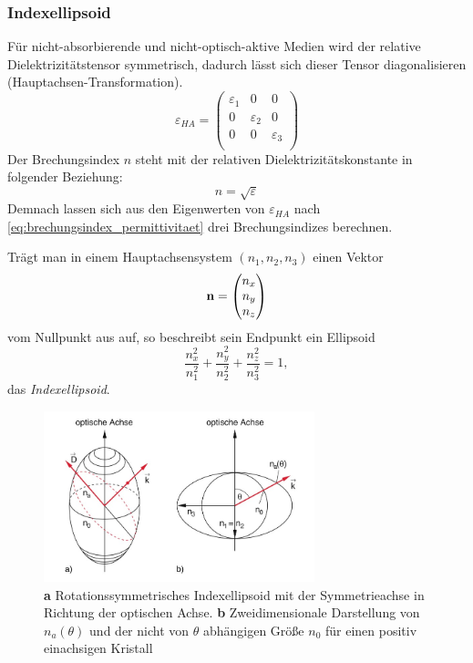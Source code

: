\documentclass[a4paper, 11pt, ngerman, parskip=half-]{scrartcl}
\begin{document}
\subsubsection*{Indexellipsoid}
Für nicht-absorbierende und nicht-optisch-aktive Medien wird der relative Dielektrizitätstensor symmetrisch, dadurch lässt sich dieser
Tensor diagonalisieren (Hauptachsen-Transformation).
%
\[\varepsilon_{HA} = \begin{pmatrix}
        \varepsilon_1 & 0             & 0             \\
        0             & \varepsilon_2 & 0             \\
        0             & 0             & \varepsilon_3 \\
    \end{pmatrix}\]
%
Der Brechungsindex $n$ steht mit der relativen Dielektrizitätskonstante in folgender Beziehung:
%
\begin{equation}
    \label{eq:brechungsindex_permittivitaet}
    n = \sqrt{\varepsilon}
\end{equation}
%
Demnach lassen sich aus den Eigenwerten von $\varepsilon_{HA}$ nach \autoref{eq:brechungsindex_permittivitaet} drei Brechungsindizes berechnen.

Trägt man in einem Hauptachsensystem $(n_1, n_2, n_3)$ einen Vektor
\[\vb{n} = \begin{pmatrix}
        n_x \\
        n_y \\
        n_z
    \end{pmatrix}\]
vom Nullpunkt aus auf, so beschreibt sein Endpunkt ein Ellipsoid
\[\frac{n_x^2}{n_1^2} + \frac{n_y^2}{n_2^2} + \frac{n_z^2}{n_3^2} = 1,\]
das \textit{Indexellipsoid}.
%
\begin{figure}[H]
    \centering
    \begin{samepage}
        \includegraphics[width=0.7\textwidth]{image/15/einachsiger_kristall.jpg}
        \caption{\textbf{a} Rotationssymmetrisches Indexellipsoid mit der Symmetrieachse in Richtung der optischen Achse. \textbf{b} Zweidimensionale Darstellung von $n_a(\theta)$ und der nicht von $\theta$ abhängigen Größe $n_0$ für einen positiv einachsigen Kristall}
        \label{fig:indexellipsoid_einachsig}
    \end{samepage}
\end{figure}
%
\end{document}
